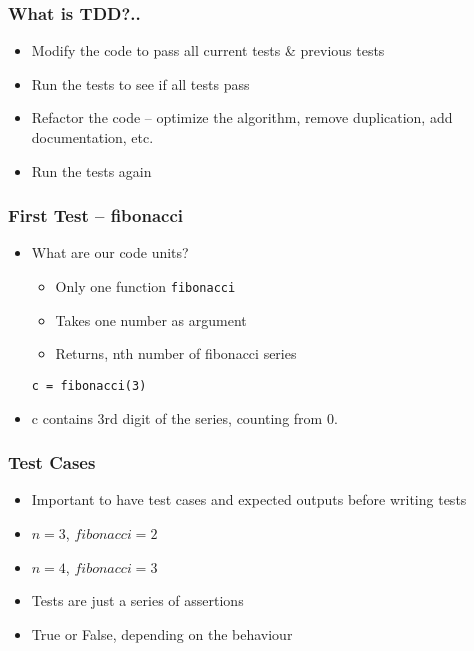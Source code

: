 \documentclass[17pt,compress]{beamer}
\begin{document}
\begin{frame}
  \frametitle{What is TDD?..}
  \begin{itemize}
  \item Modify the code to pass all current tests \& previous tests
  \item Run the tests to see if all tests pass
  \item Refactor the code -- optimize the algorithm,
    remove duplication, add documentation, etc.
  \item Run the tests again
  \end{itemize}
\end{frame}


\begin{frame}[fragile]
  \frametitle{First Test -- fibonacci}
  \begin{itemize}
  \item What are our code units?
    \begin{itemize}
    \item Only one function \texttt{fibonacci}
    \item Takes one number as argument
    \item Returns, nth number of fibonacci series
    \end{itemize}
\begin{lstlisting}
c = fibonacci(3)
\end{lstlisting}
  \item c contains 3rd digit of the series, counting from 0.
  \end{itemize}
\end{frame}

\begin{frame}[fragile]
  \frametitle{Test Cases}
  \begin{itemize}
  \item Important to have test cases and expected outputs before
    writing tests
  \item $n=3$, $fibonacci=2$
  \item $n=4$, $fibonacci=3$
  \item Tests are just a series of assertions
  \item True or False, depending on the behaviour
  \end{itemize}
\end{frame}
\end{document}
